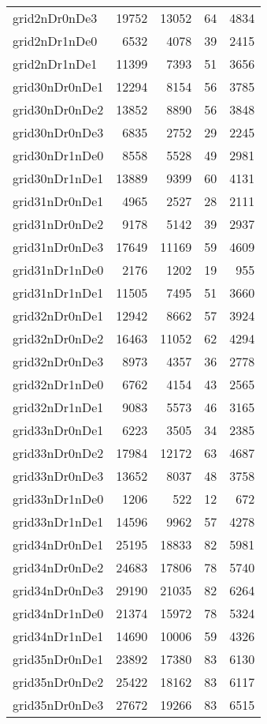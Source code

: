 \begin{tabular}{lrrrr}
grid2nDr0nDe3 & 19752 & 13052 & 64 & 4834 \\
grid2nDr1nDe0 & 6532 & 4078 & 39 & 2415 \\
grid2nDr1nDe1 & 11399 & 7393 & 51 & 3656 \\
grid30nDr0nDe1 & 12294 & 8154 & 56 & 3785 \\
grid30nDr0nDe2 & 13852 & 8890 & 56 & 3848 \\
grid30nDr0nDe3 & 6835 & 2752 & 29 & 2245 \\
grid30nDr1nDe0 & 8558 & 5528 & 49 & 2981 \\
grid30nDr1nDe1 & 13889 & 9399 & 60 & 4131 \\
grid31nDr0nDe1 & 4965 & 2527 & 28 & 2111 \\
grid31nDr0nDe2 & 9178 & 5142 & 39 & 2937 \\
grid31nDr0nDe3 & 17649 & 11169 & 59 & 4609 \\
grid31nDr1nDe0 & 2176 & 1202 & 19 & 955 \\
grid31nDr1nDe1 & 11505 & 7495 & 51 & 3660 \\
grid32nDr0nDe1 & 12942 & 8662 & 57 & 3924 \\
grid32nDr0nDe2 & 16463 & 11052 & 62 & 4294 \\
grid32nDr0nDe3 & 8973 & 4357 & 36 & 2778 \\
grid32nDr1nDe0 & 6762 & 4154 & 43 & 2565 \\
grid32nDr1nDe1 & 9083 & 5573 & 46 & 3165 \\
grid33nDr0nDe1 & 6223 & 3505 & 34 & 2385 \\
grid33nDr0nDe2 & 17984 & 12172 & 63 & 4687 \\
grid33nDr0nDe3 & 13652 & 8037 & 48 & 3758 \\
grid33nDr1nDe0 & 1206 & 522 & 12 & 672 \\
grid33nDr1nDe1 & 14596 & 9962 & 57 & 4278 \\
grid34nDr0nDe1 & 25195 & 18833 & 82 & 5981 \\
grid34nDr0nDe2 & 24683 & 17806 & 78 & 5740 \\
grid34nDr0nDe3 & 29190 & 21035 & 82 & 6264 \\
grid34nDr1nDe0 & 21374 & 15972 & 78 & 5324 \\
grid34nDr1nDe1 & 14690 & 10006 & 59 & 4326 \\
grid35nDr0nDe1 & 23892 & 17380 & 83 & 6130 \\
grid35nDr0nDe2 & 25422 & 18162 & 83 & 6117 \\
grid35nDr0nDe3 & 27672 & 19266 & 83 & 6515 \\

\end{tabular}
